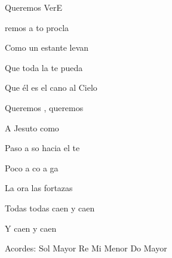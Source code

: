 \documentclass[12pt, spanish]{book}
\begin{document}
\begin{song}{Queremos Ver}{E}
\begin{SBExtraKeys}
{            \begin{SBOpGroup}
                remos a to procla

                Como un estante levan

                Que toda la te pueda 

                Que él es el cano al Cielo
            \end{SBOpGroup}

            \begin{SBChorus}
                Queremos , queremos 

                A Jesuto como 
            \end{SBChorus}

            \begin{SBOpGroup}
                Paso a so hacia el te

                Poco a co a ga

                La ora las fortazas

                Todas  todas caen y caen

                Y caen y caen
            \end{SBOpGroup}

            \ifChordBk
            \begin{SBOpGroup}
                Acordes:
                \upchord{\G}\qquad Sol Mayor \hfill
                \upchord{\D}\qquad Re \hfill\null\break
                \upchord{\Em}\qquad Mi Menor \hfill
                \upchord{\C}\qquad Do Mayor \hfill\null\break
            \end{SBOpGroup}
            \fi
        }\end{SBExtraKeys}
    \end{song}
\end{document}
